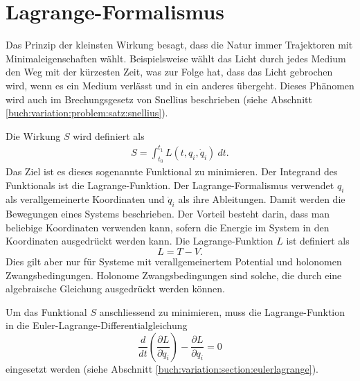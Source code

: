 \section{Lagrange-Formalismus}
%
Das Prinzip der kleinsten Wirkung besagt, dass die Natur immer Trajektoren
mit Minimaleigenschaften wählt.
%
Beispielsweise wählt das Licht durch jedes Medium den Weg mit der kürzesten Zeit, was zur Folge hat,
dass das Licht gebrochen wird, wenn es ein Medium verlässt und in ein anderes übergeht.
Dieses Phänomen wird auch im Brechungsgesetz von Snellius beschrieben
(siehe Abschnitt \ref{buch:variation:problem:satz:snellius}).
%
%

Die Wirkung \(S\) wird definiert als
%
\begin{align*}
    S = \int_{t_0}^{t_1} L(t,q_i,\dot{q}_i) \: dt.
\end{align*}
Das Ziel ist es dieses sogenannte Funktional zu minimieren.
Der Integrand des Funktionals ist die Lagrange-Funktion.
Der Lagrange-Formalismus verwendet \(q_i\) als verallgemeinerte Koordinaten
und \(\dot{q}_i\) als ihre Ableitungen.
Damit werden die Bewegungen eines Systems beschrieben.
Der Vorteil besteht darin, dass man beliebige Koordinaten verwenden kann,
sofern die Energie im System in den Koordinaten ausgedrückt werden kann.
Die Lagrange-Funktion \(L\) ist definiert als
\begin{equation}
    L = T - V.
    \label{eq:lagrange} 
\end{equation}
Dies gilt aber nur für Systeme mit verallgemeinertem Potential und holonomen Zwangsbedingungen.
%
%
Holonome Zwangsbedingungen sind solche, die durch eine algebraische Gleichung
ausgedrückt werden können.

Um das Funktional $S$ anschliessend zu minimieren, muss die Lagrange-Funktion in die
Euler-Lagrange-Differentialgleichung
\begin{equation*}
    \frac{d}{dt} \left( \frac{\partial L}{\partial \dot{q}_i} \right) 
    - \frac{\partial L}{\partial q_i} = 0
\end{equation*}
eingesetzt werden
(siehe Abschnitt \ref{buch:variation:section:eulerlagrange}).




